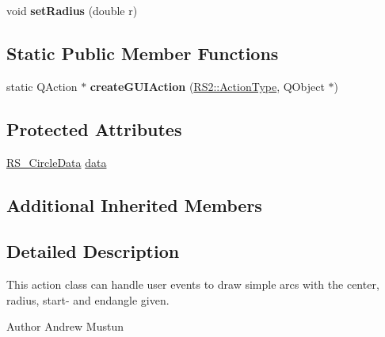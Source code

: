 \begin{DoxyCompactItemize}
\item 
\hypertarget{classRS__ActionDrawCircleCR_aa49c9db46ee721181823a7cb4f68701b}{void {\bfseries set\-Radius} (double r)}\label{classRS__ActionDrawCircleCR_aa49c9db46ee721181823a7cb4f68701b}

\end{DoxyCompactItemize}
\subsection*{Static Public Member Functions}
\begin{DoxyCompactItemize}
\item 
\hypertarget{classRS__ActionDrawCircleCR_ab7e600bb33754531cf0e12bac76d8823}{static Q\-Action $\ast$ {\bfseries create\-G\-U\-I\-Action} (\hyperlink{classRS2_afe3523e0bc41fd637b892321cfc4b9d7}{R\-S2\-::\-Action\-Type}, Q\-Object $\ast$)}\label{classRS__ActionDrawCircleCR_ab7e600bb33754531cf0e12bac76d8823}

\end{DoxyCompactItemize}
\subsection*{Protected Attributes}
\begin{DoxyCompactItemize}
\item 
\hyperlink{classRS__CircleData}{R\-S\-\_\-\-Circle\-Data} \hyperlink{classRS__ActionDrawCircleCR_aa4d042399a67d65e6dece026faaaaf76}{data}
\end{DoxyCompactItemize}
\subsection*{Additional Inherited Members}


\subsection{Detailed Description}
This action class can handle user events to draw simple arcs with the center, radius, start-\/ and endangle given.

\begin{DoxyAuthor}{Author}
Andrew Mustun 
\end{DoxyAuthor}


